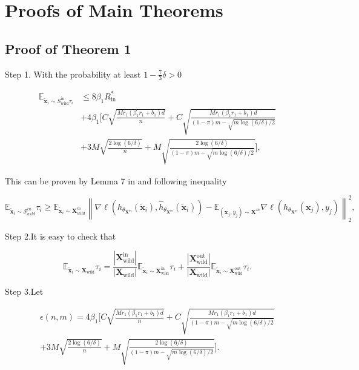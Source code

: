\section{Proofs of Main Theorems}\label{sec-appendix-proof}
\subsection{Proof of Theorem 1}
Step 1. With the probability at least $1-\frac{7}{3}\delta>0$

$$\begin{aligned}
\mathbb{E}_{\tilde{\mathbf{x}}_{i}\sim S_{\mathrm{wild}}^{\mathrm{in}}\tau_{i}}& \leq8\beta_{1}R_{\mathrm{in}}^{*}  \\
&+4\beta_{1}\Big[C\sqrt{\frac{Mr_{1}(\beta_{1}r_{1}+b_{1})d}{n}}+C\sqrt{\frac{Mr_{1}(\beta_{1}r_{1}+b_{1})d}{(1-\pi)m-\sqrt{m\log(6/\delta)/2}}} \\
&+3M\sqrt{\frac{2\log(6/\delta)}{n}}+M\sqrt{\frac{2\log(6/\delta)}{(1-\pi)m-\sqrt{m\log(6/\delta)/2}}}\Big],
\end{aligned}$$

This can be proven by Lemma 7 in \citep{du2024does} and following inequality

$$\mathbb{E}_{\tilde{\mathbf{x}}_{i}\sim\mathcal{S}_{wild}^{in}}\tau_{i}\geq\mathbb{E}_{\tilde{\mathbf{x}}_{i}\sim\boldsymbol{X}_{wild}^{m}}\left\|\nabla\ell(h_{\theta_{\boldsymbol{X}^{m}}}(\tilde{\mathbf{x}}_{i}),\widehat{{h}}_{\theta_{\boldsymbol{X}^{m}}}(\tilde{\mathbf{x}}_{i}))-\mathbb{E}_{(\mathbf{x}_{j},y_{j})\sim\boldsymbol{X}^{m}}\nabla\ell(h_{\theta_{\boldsymbol{X}^{m}}}(\mathbf{x}_{j}),y_{j})\right\|_{2}^{2},$$

Step 2.It is easy to check that

$$\mathbb{E}_{\tilde{\mathbf{x}}_{i}\sim\boldsymbol{X}_{\mathrm{wild}}}\tau_{i}=\frac{|\boldsymbol{X}_{\mathrm{wild}}^{\mathrm{in}}|}{|\boldsymbol{X}_{\mathrm{wild}}|}\mathbb{E}_{\tilde{\mathbf{x}}_{i}\sim\boldsymbol{X}_{\mathrm{wild}}^{\mathrm{in}}}\tau_{i}+\frac{|\boldsymbol{X}_{\mathrm{wild}}^{\mathrm{out}}|}{|\boldsymbol{X}_{\mathrm{wild}}|}\mathbb{E}_{\tilde{\mathbf{x}}_{i}\sim\boldsymbol{X}_{\mathrm{wild}}^{\mathrm{out}}}\tau_{i}.$$

Step 3.Let

$$\begin{gathered}
\epsilon(n,m)= 4\beta_{1}[C\sqrt{\frac{Mr_{1}(\beta_{1}r_{1}+b_{1})d}{n}}+C\sqrt{\frac{Mr_{1}(\beta_{1}r_{1}+b_{1})d}{(1-\pi)m-\sqrt{m\log(6/\delta)/2}}} \\
+3M\sqrt{\frac{2\log(6/\delta)}{n}}+M\sqrt{\frac{2\log(6/\delta)}{(1-\pi)m-\sqrt{m\log(6/\delta)/2}}}]. 
\end{gathered}$$

